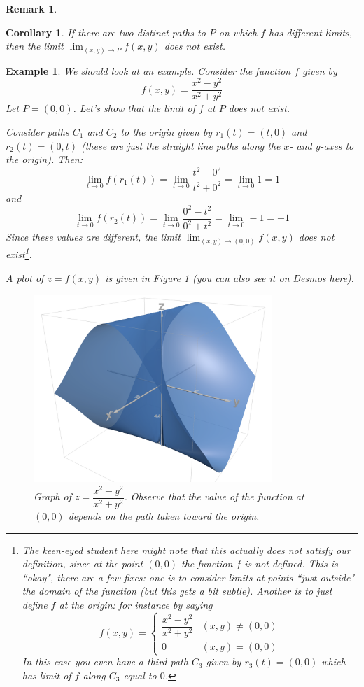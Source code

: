 \documentclass[12pt]{article}
\numberwithin{equation}{subsection}
\numberwithin{figure}{subsection}
\newtheorem{corr}[subsection]{Corollary}
\theoremstyle{note}
\newtheorem{example}[subsection]{Example}
\newtheorem{remark}[subsection]{Remark}
\begin{document}
{\begin{remark}
\end{remark}

\begin{corr}
	If there are two distinct paths to $P$ on which $f$ has different limits, then the limit $\displaystyle \lim_{(x,y)\to P} f(x,y)$ does not exist.
\end{corr}

\begin{example}
	We should look at an example. Consider the function $f$ given by \[ f(x,y)=\dfrac{x^2-y^2}{x^2+y^2}\] Let $P=(0,0)$. Let's show that the limit of $f$ at $P$ does not exist. 
	
	Consider paths $C_1$ and $C_2$ to the origin given by $r_1(t)=(t,0)$ and $r_2(t)=(0,t)$ (these are just the straight line paths along the $x$- and $y$-axes to the origin). Then: \[ \lim_{t\to 0} f(r_1(t))=\lim_{t\to 0} \dfrac{t^2-0^2}{t^2+0^2}=\lim_{t\to 0} 1=1\] and \[ \lim_{t\to 0} f(r_2(t))=\lim_{t\to 0} \dfrac{0^2-t^2}{0^2+t^2}=\lim_{t\to 0} -1=-1\] 
	Since these values are different, the limit $\displaystyle \lim_{(x,y)\to(0,0)} f(x,y)$ does not exist\footnote{The keen-eyed student here might note that this actually does not satisfy our definition, since at the point $(0,0)$ the function $f$ is not defined. This is ``okay", there are a few fixes: one is to consider limits at points ``just outside" the domain of the function (but this gets a bit subtle). Another is to just define $f$ at the origin: for instance by saying \[ f(x,y)=\begin{cases} \dfrac{x^2-y^2}{x^2+y^2} & (x,y)\neq (0,0) \\ 0 & (x,y)=(0,0) \end{cases} \] In this case you even have a third path $C_3$ given by $r_3(t)=(0,0)$ which has limit of $f$ along $C_3$ equal to $0$. }. 
	
	
	A plot of $z=f(x,y)$ is given in Figure \ref{ex-surface-cont} (you can also see it on Desmos \href{https://www.desmos.com/3d/fhsc1uelpj}{here}).
	\begin{figure}[h!]
	\centering
	\includegraphics[width=90mm]{Images/surface-non-cont}
	\caption{Graph of $z=\dfrac{x^2-y^2}{x^2+y^2}$. Observe that the value of the function at $(0,0)$ depends on the path taken toward the origin.}
	\label{ex-surface-cont}
	\end{figure}
\end{example}


}
\end{document}
